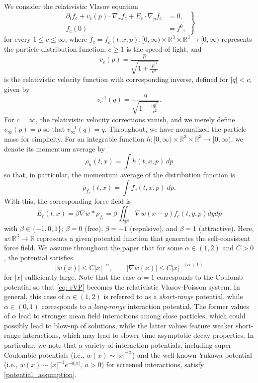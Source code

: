 \documentclass[reqno, 11pt, letterpaper]{amsart}
\theoremstyle{remark}
\numberwithin{equation}{section}
\numberwithin{theorem}{section}
\numberwithin{table}{section}
\numberwithin{figure}{section}
\begin{document}
We consider the relativistic Vlasov equation
\begin{equation}\label{eq: rVP}
\left.
\begin{aligned}
\partial_t f_c+v_c(p)\cdot\nabla_x f_c+E_c\cdot\nabla_p f_c&=0,\\
f_c(0)&=f^0,
\end{aligned}
\right\}
\end{equation}
for every $1 \leq c \leq \infty$, 
where $f_c=f_c(t,x,p): [0,\infty) \times\mathbb{R}^3\times\mathbb{R}^3\to [0,\infty)$ represents the particle distribution function, $c\geq 1$ is the speed of light, and
$$v_c(p) = \frac{p}{\sqrt{1+\tfrac{|p|^2}{c^2}}}$$ 
is the relativistic velocity function with corresponding inverse, defined for $|q| < c$, given by
$$v_c^{-1}(q) = \frac{q}{\sqrt{1-\frac{|q|^2}{c^2}}}.$$
For $c = \infty$, the relativistic velocity corrections vanish, and we merely define $v_\infty(p) = p$ so that $v_\infty^{-1}(q) = q$. 
Throughout, we have normalized the particle mass for simplicity.
For an integrable function $h: [0,\infty) \times\mathbb{R}^3\times\mathbb{R}^3\to [0,\infty)$, we denote its momentum average by
$$\rho_h(t,x) = \int h(t,x,p) \ dp$$
so that, in particular, the momentum average of the distribution function is
$$\rho_{f_c}(t,x) = \int f_c(t,x,p) \ dp.$$
With this, the corresponding force field is
\begin{equation}\label{eq: rVP, force field}
E_c(t,x)=\beta \nabla w*\rho_{f_c}=\beta \iint_{\mathbb{R}^6}\nabla w(x-y)f_c(t,y,p) dydp
\end{equation}
with $\beta\in\{-1,0,1\}$; $\beta=0$ (free), $\beta=-1$ (repulsive), and $\beta=1$ (attractive). 
Here, $w: \mathbb{R}^3 \to  \mathbb{R}$ represents a given potential function that generates the self-consistent force field.
We assume throughout the paper that for some $\alpha \in (1,2)$ and $C > 0$, the potential satisfies
\begin{equation}
\label{potential_assumption}
|w(x)| \leq C|x|^{-\alpha}, \qquad 
|\nabla w(x)|\leq C|x|^{-(\alpha+1)}
\end{equation}
for $|x|$ sufficiently large. Note that the case $\alpha = 1$ corresponds to the Coulomb potential so that \eqref{eq: rVP} becomes the relativistic Vlasov-Poisson system.
In general, this case of $\alpha \in (1,2)$ is referred to as a \textit{short-range} potential, while $\alpha \in (0,1)$ corresponds to a \textit{long-range} interaction potential.
The former values of $\alpha$ lead to stronger mean field interactions among close particles, which could possibly lead to blow-up of solutions, while the latter values feature weaker short-range interactions, which may lead to slower time-asymptotic decay properties.
In particular, we note that a variety of interaction potentials, including super-Coulombic potentials \cite{HuangKwon}  (i.e., $w(x) \sim |x|^{-\alpha}$) and the well-known Yukawa potential \cite{HaLee}  (i.e., $w(x) \sim |x|^{-1} e^{-a|x|}, \ a > 0$) for screened interactions, satisfy \eqref{potential_assumption}.
\end{document}
